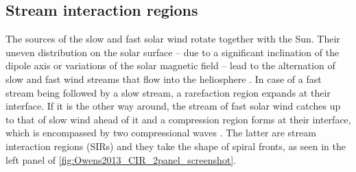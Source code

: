 \subsection{Stream interaction regions}
The sources of the slow and fast solar wind rotate together with the Sun. Their uneven distribution on the solar surface -- due to a significant inclination of the dipole axis or variations of the solar magnetic field -- lead to the alternation of slow and fast wind streams that flow into the heliosphere \citep{Owens2013}.
In case of a fast stream being followed by a slow stream, a rarefaction region expands at their interface. If it is the other way around, the stream of fast solar wind catches up to that of slow wind ahead of it and a compression region forms at their interface, which is encompassed by two compressional waves \citep{Balogh2009}. The latter are stream interaction regions (SIRs) and they take the shape of spiral fronts, as seen in the left panel of \autoref{fig:Owens2013_CIR_2panel_screenshot}.
\begin{figure}[htb]
\end{figure}

